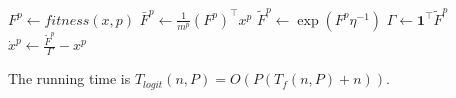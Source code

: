 \begin{algorithm}[H]

 \BlankLine
 
  {
  $ F^p \leftarrow fitness(x, p)$\;
  $ \bar{F}^p \leftarrow \frac{1}{m^p} (F^p)^\top x^p$\;
  $ \tilde{F}^p \leftarrow \exp( F^p \eta^{-1} )$\;
  $ \Gamma \leftarrow \boldsymbol{1}^\top \tilde{F}^p $\;
  $ \dot{x}^p \leftarrow \frac{\tilde{F}^p}{\Gamma} - x^p $\;
 }
\end{algorithm}

The running time is $T_{logit}(n,P) = O( P (  T_{f}(n,P) + n) ) $.



\iffalse
\subsection{Maynard Smith Replicator}

\begin{equation}
\dot{x}_i = \frac{ x_i F_i }{ \bar{F}(x) } - x_i
\end{equation}
\fi


